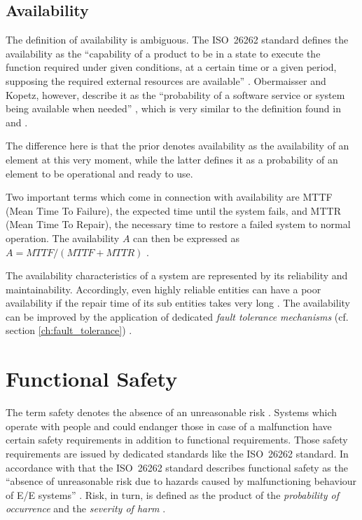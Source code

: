 \subsection{Availability}

\label{sec:availability}
The definition of availability is ambiguous. The \mbox{ISO 26262} standard defines the availability as the ``capability of a product to be in a state to execute the function required under given conditions, at a certain time or a given period, supposing the required external resources are available'' \cite{iso26262:1}. Obermaisser and Kopetz, however, describe it as the ``probability of a software service or system being available when needed'' \cite[p.116]{genesys}, which is very similar to the definition found in \cite{lessner} and \cite{nelson}.

The difference here is that the prior denotes availability as the availability of an element at this very moment, while the latter defines it as a probability of an element to be operational and ready to use.

Two important terms which come in connection with availability are MTTF (Mean Time To Failure), the expected time until the system fails, and MTTR (Mean Time To Repair), the necessary time to restore a failed system to normal operation. The availability $A$ can then be expressed as $A = MTTF/(MTTF + MTTR)$ \cite{nelson}. 

The availability characteristics of a system are represented by its reliability and maintainability. Accordingly, even highly reliable entities can have a poor availability if the repair time of its sub entities takes very long \cite{lessner}. The availability can be improved by the application of dedicated \emph{fault tolerance mechanisms} (cf. section \ref{ch:fault_tolerance}) \cite{nelson}.















\section{Functional Safety}
\label{ch:functional_safety}

The term safety denotes the absence of an unreasonable risk \cite{iso26262:1}. Systems which operate with people and could endanger those in case of a malfunction have certain safety requirements in addition to functional requirements. Those safety requirements are issued by dedicated standards like the \mbox{ISO 26262} standard. In accordance with that the \mbox{ISO 26262} standard describes functional safety as the ``absence of unreasonable risk due to hazards caused by malfunctioning behaviour of E/E systems'' \cite{iso26262:1}. Risk, in turn, is defined as the product of the \emph{probability of occurrence} and the \emph{severity of harm} \cite{iso26262:1}.

